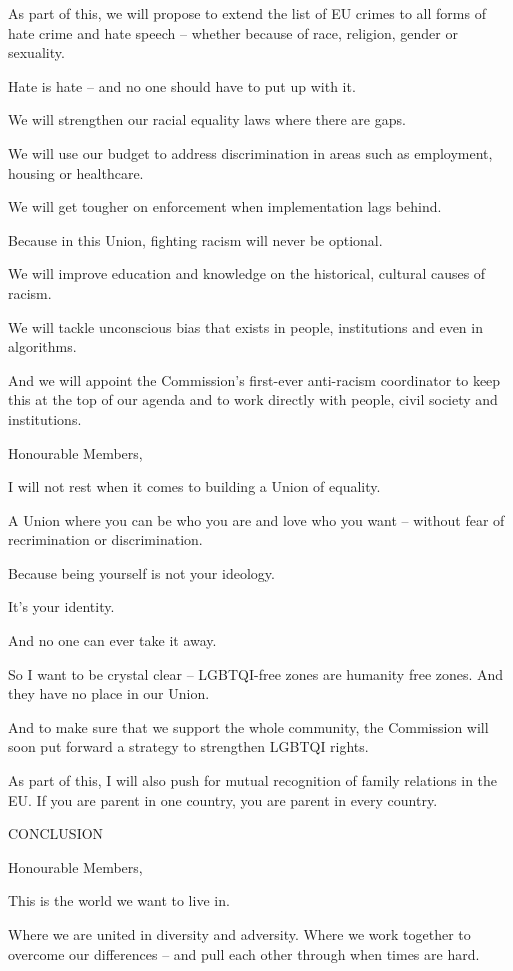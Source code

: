 \documentclass[a4paper,11pt]{article}
\begin{document}
As part of this, we will propose to extend the list of EU crimes to all forms of hate crime and hate speech – whether because of race, religion, gender or sexuality.

Hate is hate – and no one should have to put up with it.

We will strengthen our racial equality laws where there are gaps.

We will use our budget to address discrimination in areas such as employment, housing or healthcare.

We will get tougher on enforcement when implementation lags behind.

Because in this Union, fighting racism will never be optional.

We will improve education and knowledge on the historical, cultural causes of racism.

We will tackle unconscious bias that exists in people, institutions and even in algorithms.

And we will appoint the Commission's first-ever anti-racism coordinator to keep this at the top of our agenda and to work directly with people, civil society and institutions.   

 

Honourable Members,

I will not rest when it comes to building a Union of equality.

A Union where you can be who you are and love who you want – without fear of recrimination or discrimination.

Because being yourself is not your ideology.

It's your identity.

And no one can ever take it away.

So I want to be crystal clear – LGBTQI-free zones are humanity free zones. And they have no place in our Union.

And to make sure that we support the whole community, the Commission will soon put forward a strategy to strengthen LGBTQI rights.

As part of this, I will also push for mutual recognition of family relations in the EU. If you are parent in one country, you are parent in every country.  

 

CONCLUSION

Honourable Members,

This is the world we want to live in.

Where we are united in diversity and adversity. Where we work together to overcome our differences – and pull each other through when times are hard.
\end{document}
